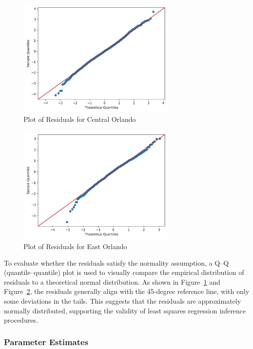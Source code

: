 \begin{figure}[H]
	\centering
	\includegraphics[width=0.7\textwidth]{Figures/qqplot_orlando_central.png}
    \caption{Plot of Residuals for Central Orlando}
	\label{fig:2}
\end{figure}

\begin{figure}[H]
	\centering
	\includegraphics[width=0.7\textwidth]{Figures/qqplot_orlando_east.png}
    \caption{Plot of Residuals for East Orlando}
	\label{fig:3}
\end{figure}


To evaluate whether the residuals satisfy the normality assumption, a Q–Q (quantile–quantile) plot is used to visually compare the empirical distribution of residuals to a theoretical normal distribution. As shown in Figure~\ref{fig:2} and Figure~\ref{fig:3}, the residuals generally align with the 45-degree reference line, with only some deviations in the tails. This suggests that the residuals are approximately normally distributed, supporting the validity of least squares regression inference procedures.

\subsubsection*{Parameter Estimates}


